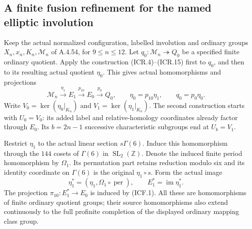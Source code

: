 \subsection{A finite fusion refinement for the named elliptic involution}

Keep the actual normalized configuration, labelled involution and
ordinary groups $X_n,x_n,K_n,\mathcal M_n$ of A.4.54, for
$9\leq n\leq12$.  Let
$q_0:\mathcal M_n\twoheadrightarrow Q_0$ be a specified finite
ordinary quotient.  Apply the construction (ICR.4)--(ICR.15)
first to $q_0$, and then to its resulting actual quotient $\eta_0$.
This gives actual homomorphisms and projections
\[
 \mathcal M_n\xrightarrow{\eta_1}E_1
       \xrightarrow{p_{10}}E_0\xrightarrow{p_0}Q_0,
 \qquad \eta_0=p_{10}\eta_1,\qquad q_0=p_0\eta_0.
                                                               \tag{ICF.1}
\]
Write $V_0=\ker(\eta_0|_{K_n})$ and
$V_1=\ker(\eta_1|_{K_n})$.  The second construction starts with
$U_0=V_0$: its added label and relative-homology coordinates
already factor through $E_0$.  Its $b=2n-1$ successive
characteristic subgroups end at $U_b=V_1$.

Restrict $\eta_1$ to the actual linear section
$s\Gamma(6)$.  Induce this homomorphism through the $144$
cosets of $\Gamma(6)$ in $\operatorname{SL}_2(\mathbb Z)$.
Denote the induced finite period homomorphism by $\Omega_1$.
Its permutation part retains reduction modulo six and its
identity coordinate on $\Gamma(6)$ is the original
$\eta_1\circ s$.  Form the actual image
\[
 \eta_1^*=(\eta_1,\Omega_1\circ\operatorname{per}),
 \qquad E_1^*=\operatorname{im}\eta_1^*.
                                                               \tag{ICF.2}
\]
The projection $\pi_{10}:E_1^*\to E_0$ is induced by (ICF.1).
All these are homomorphisms of finite ordinary quotient groups;
their source homomorphisms also extend continuously to the full
profinite completion of the displayed ordinary mapping class group.

